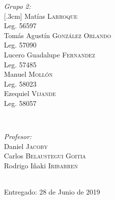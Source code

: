 \begin{titlepage}
\begin{minipage}{0.4\textwidth}
\begin{flushleft} \large
\emph{Grupo 2:}\\
[.3cm]     Matías \textsc{Larroque}\\     Leg. 56597\\      [.3cm]
Tomás Agustín \textsc{González Orlando}\\     Leg. 57090\\      [.3cm]
Lucero Guadalupe \textsc{Fernandez}\\     Leg. 57485\\      [.3cm]
Manuel \textsc{Mollón}\\     Leg. 58023\\      [.3cm]
Ezequiel \textsc{Vijande}\\     Leg. 58057\\      [.3cm]
\end{flushleft}
\end{minipage}     ~
\begin{minipage}{0.4\textwidth}
\begin{flushright} \large     \emph{Profesor:} \\     [.3cm]
Daniel \textsc{Jacoby}\\ %
Carlos \textsc{Belaustegui Goitia}\\
Rodrigo Iñaki \textsc{Iribarren}\\     \end{flushright}     \end{minipage}\\[2cm]
\vfill
{\large Entregado: 28 de Junio de 2019}\\[2cm]
\end{titlepage}
